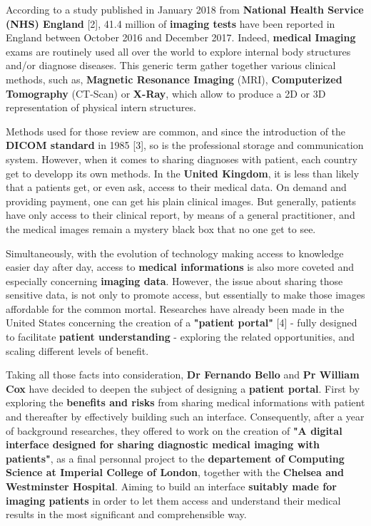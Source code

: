 According to a study published in January 2018 from \textbf{National Health Service (NHS) England} [2], 41.4 million of \textbf{imaging tests} have been reported in England between October 2016 and December 2017. Indeed, \textbf{medical Imaging} exams are routinely used all over the world to explore internal body structures and/or diagnose diseases. This generic term gather together various clinical methods, such as, \textbf{Magnetic Resonance Imaging} (MRI), \textbf{Computerized Tomography} (CT-Scan) or \textbf{X-Ray}, which allow to produce a 2D or 3D representation of physical intern structures. 

\newline \vspace{5mm}

Methods used for those review are common, and since the introduction of the \textbf{DICOM standard} in 1985 [3], so is the professional storage and communication system. However, when it comes to sharing diagnoses with patient, each country get to developp its own methods. In the \textbf{United Kingdom}, it is less than likely that a patients get, or even ask, access to their medical data. On demand and providing payment, one can get his plain clinical images. But generally, patients have only access to their clinical report, by means of a general practitioner, and the medical images remain a mystery black box that no one get to see. 

\newline \vspace{5mm}

Simultaneously, with the evolution of technology making access to knowledge easier day after day, access to \textbf{medical informations} is also more coveted and especially concerning \textbf{imaging data}. However, the issue about sharing those sensitive data, is not only to promote access, but essentially to make those images affordable for the common mortal. Researches have already been made in the United States concerning the creation of a \textbf{"patient portal"} [4] - fully designed to facilitate \textbf{patient understanding} - exploring the related opportunities, and scaling different levels of benefit. 

\newline \vspace{5mm}

Taking all those facts into consideration, \textbf{Dr Fernando Bello} and \textbf{Pr William Cox} have decided to deepen the subject of designing a \textbf{patient portal}. First by exploring the \textbf{benefits and risks} from sharing medical informations with patient and thereafter by effectively building such an interface. Consequently, after a year of background researches, they offered to work on the creation of \textbf{"A digital interface designed for sharing diagnostic medical imaging with patients"}, as a final personnal project to the \textbf{departement of Computing Science at Imperial College of London}, together with the \textbf{Chelsea and Westminster Hospital}. Aiming to build an interface \textbf{suitably made for imaging patients} in order to let them access and understand their medical results in the most significant and comprehensible way.


